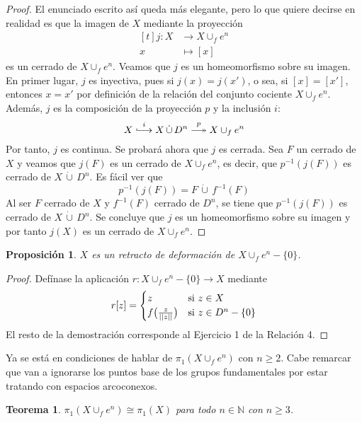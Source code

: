 \documentclass[11pt]{report}
\newenvironment{ctheorem} %
  {\begin{mdframed}[innertopmargin = 0pt,
                    innerbottommargin = 7.5pt,
                    backgroundcolor = lightgray!10,
                    linewidth = 1pt,
                    shadow = true,
                    shadowsize = 5pt,
                    roundcorner = 0pt,
                    skipabove = 0pt]
    \begin{theorem}}
  {\end{theorem}\end{mdframed}}
\newtheorem{proposition}{Proposición}[chapter]
\newtheorem{theorem}{Teorema}[chapter]
\theoremstyle{definition}
\theoremstyle{definition}
\theoremstyle{remark}
\newcommand{\N}{\mathbb N}
\begin{document}
\begin{proof}
El enunciado escrito así queda más elegante, pero lo que quiere decirse en realidad es que la imagen de $X$ mediante la proyección
\[
\begin{aligned}[t]
    j \colon X &\longrightarrow X \cup_f e^n \\
    x &\longmapsto [x]
\end{aligned}
\]
es un cerrado de $X \cup_f e^n$. Veamos que $j$ es un homeomorfismo sobre su imagen. En primer lugar, $j$ es inyectiva, pues si $j(x) = j(x')$, o sea, si $[x] = [x']$, entonces $x = x'$ por definición de la relación del conjunto cociente $X \cup_f e^n$. Además, $j$ es la composición de la proyección $p$ y la inclusión $i$:
\[X \overset{i}{\lhook\joinrel\longrightarrow} X \, \dot\cup \, D^n \overset{p}{\relbar\joinrel\twoheadrightarrow} X \cup_f e^n\]
Por tanto, $j$ es continua. Se probará ahora que $j$ es cerrada. Sea $F$ un cerrado de $X$ y veamos que $j(F)$ es un cerrado de $X \cup_f e^n$, es decir, que $p^{-1}(j(F))$ es cerrado de $X \, \dot\cup \, D^n$. Es fácil ver que
\[p^{-1}(j(F)) = F \, \dot\cup \, f^{-1}(F)\]
Al ser $F$ cerrado de $X$ y $f^{-1}(F)$ cerrado de $D^n$, se tiene que $p^{-1}(j(F))$ es cerrado de $X \, \dot\cup \, D^n$. Se concluye que $j$ es un homeomorfismo sobre su imagen y por tanto $j(X)$ es un cerrado de $X \cup_f e^n$.
\end{proof}

\begin{proposition}
$X$ es un retracto de deformación de $X \cup_f e^n - \{0\}$.
\end{proposition}

\begin{proof}
Defínase la aplicación $r \colon X \cup_f e^n - \{0\} \to X$ mediante
\[r[z] = \begin{cases}
    z & $si$ \ z \in X \\
    f\bigl(\frac{z}{||z||}\bigr) & $si$ \ z \in D^n - \{0\}
\end{cases}\]
El resto de la demostración corresponde al Ejercicio 1 de la Relación 4.
\end{proof}

Ya se está en condiciones de hablar de $\pi_1(X \cup_f e^n)$ con $n \geq 2$. Cabe remarcar que van a ignorarse los puntos base de los grupos fundamentales por estar tratando con espacios arcoconexos.

\hfill

\begin{ctheorem}
    $\pi_1(X \cup_f e^n) \cong \pi_1(X)$ para todo $n \in \N$ con $n \geq 3$.
\end{ctheorem}
\end{document}
